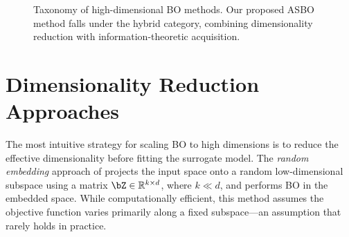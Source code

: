 \begin{figure}[htbp]
    \centering
    \caption{Taxonomy of high-dimensional BO methods.  Our proposed ASBO
    method falls under the hybrid category, combining dimensionality reduction
    with information-theoretic acquisition.}
    \label{fig:taxonomy}
\end{figure}

\section{Dimensionality Reduction Approaches}
\label{sec:dim-reduction}

The most intuitive strategy for scaling BO to high dimensions is to reduce the
effective dimensionality before fitting the surrogate model.  The
\emph{random embedding} approach of \citet{bibid} projects the input space
onto a random low-dimensional subspace using a matrix $\bZ \in \R^{k \times d}$,
where $k \ll d$, and performs BO in the embedded space.  While computationally
efficient, this method assumes the objective function varies primarily along a
fixed subspace---an assumption that rarely holds in practice.

